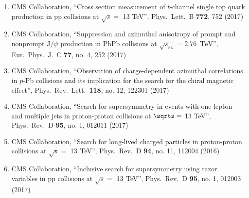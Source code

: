 \begin{enumerate}
\item CMS Collaboration, ``Cross section measurement of $t$-channel single top quark production in pp collisions at $\sqrt s =$ 13 TeV'', Phys.\ Lett.\ B {\bf 772}, 752 (2017)

\item CMS Collaboration, ``Suppression and azimuthal anisotropy of prompt and nonprompt ${\mathrm{J}}/\psi $ production in PbPb collisions at $\sqrt{{s_{_{\text {NN}}}}} =2.76$ $\,\mathrm{TeV}$'', Eur.\ Phys.\ J.\ C {\bf 77}, no. 4, 252 (2017)

\item CMS Collaboration, ``Observation of charge-dependent azimuthal correlations in $p$-Pb collisions and its implication for the search for the chiral magnetic effect'', Phys.\ Rev.\ Lett.\  {\bf 118}, no. 12, 122301 (2017)

\item CMS Collaboration, ``Search for supersymmetry in events with one lepton and multiple jets in proton-proton collisions at $\sqrts =$ 13 TeV'', Phys.\ Rev.\ D {\bf 95}, no. 1, 012011 (2017)

\item CMS Collaboration, ``Search for long-lived charged particles in proton-proton collisions at $\sqrt s=$ 13  TeV'', Phys.\ Rev.\ D {\bf 94}, no. 11, 112004 (2016)

\item CMS Collaboration, ``Inclusive search for supersymmetry using razor variables in pp collisions at $\sqrt s=$ 13  TeV'', Phys.\ Rev.\ D {\bf 95}, no. 1, 012003 (2017)


\end{enumerate}
